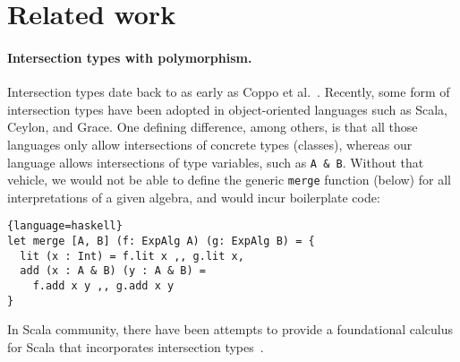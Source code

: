 \section{Related work} \label{sec:related-work}






\paragraph{Intersection types with polymorphism.}

Intersection types date back to as early as Coppo et
al.~\cite{coppo1981functional}. Recently, some form of intersection types have
been adopted in object-oriented languages such as Scala, Ceylon, and Grace. One
defining difference, among others, is that all those languages only allow
intersections of concrete types (classes), whereas our language allows
intersections of type variables, such as \texttt{A \& B}. Without that vehicle,
we would not be able to define the generic \texttt{merge} function (below) for
all interpretations of a given algebra, and would incur boilerplate code:
\begin{lstlisting}{language=haskell}
let merge [A, B] (f: ExpAlg A) (g: ExpAlg B) = {
  lit (x : Int) = f.lit x ,, g.lit x,
  add (x : A & B) (y : A & B) =
    f.add x y ,, g.add x y
}
\end{lstlisting}
In Scala community, there have been attempts to provide a foundational calculus
for Scala that incorporates intersection
types~\cite{amin2014foundations,amin2012dependent}.

